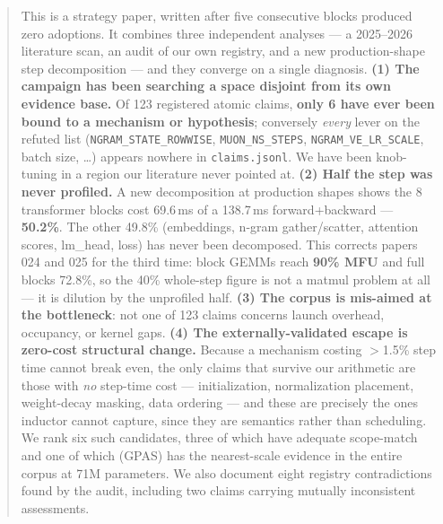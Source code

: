 \documentclass{article}
\begin{document}
\printAffiliationsAndNotice{}

\begin{abstract}
This is a strategy paper, written after five consecutive blocks produced zero adoptions. It combines three independent analyses --- a 2025--2026 literature scan, an audit of our own registry, and a new production-shape step decomposition --- and they converge on a single diagnosis. \textbf{(1) The campaign has been searching a space disjoint from its own evidence base.} Of 123 registered atomic claims, \textbf{only 6 have ever been bound to a mechanism or hypothesis}; conversely \emph{every} lever on the refuted list (\texttt{NGRAM\_STATE\_ROWWISE}, \texttt{MUON\_NS\_STEPS}, \texttt{NGRAM\_VE\_LR\_SCALE}, batch size, \ldots) appears nowhere in \texttt{claims.jsonl}. We have been knob-tuning in a region our literature never pointed at. \textbf{(2) Half the step was never profiled.} A new decomposition at production shapes shows the 8 transformer blocks cost 69.6\,ms of a 138.7\,ms forward+backward --- \textbf{50.2\%}. The other 49.8\% (embeddings, n-gram gather/scatter, attention scores, lm\_head, loss) has never been decomposed. This corrects papers 024 and 025 for the third time: block GEMMs reach \textbf{90\% MFU} and full blocks 72.8\%, so the 40\% whole-step figure is not a matmul problem at all --- it is dilution by the unprofiled half. \textbf{(3) The corpus is mis-aimed at the bottleneck}: not one of 123 claims concerns launch overhead, occupancy, or kernel gaps. \textbf{(4) The externally-validated escape is zero-cost structural change.} Because a mechanism costing $>$1.5\% step time cannot break even, the only claims that survive our arithmetic are those with \emph{no} step-time cost --- initialization, normalization placement, weight-decay masking, data ordering --- and these are precisely the ones inductor cannot capture, since they are semantics rather than scheduling. We rank six such candidates, three of which have adequate scope-match and one of which (GPAS) has the nearest-scale evidence in the entire corpus at 71M parameters. We also document eight registry contradictions found by the audit, including two claims carrying mutually inconsistent assessments.
\end{abstract}
\end{document}
